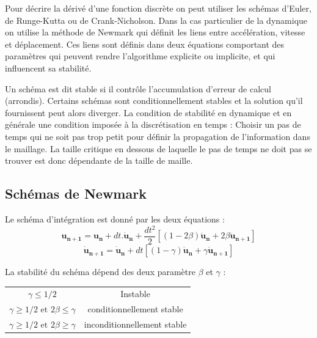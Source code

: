 \documentclass[12pt,a4paper]{report}
\begin{document}
Pour décrire la dérivé d'une fonction discrète on peut utiliser les schémas d'Euler, de Runge-Kutta ou de Crank-Nicholson. Dans la cas particulier de la dynamique on utilise la méthode de Newmark qui définit les liens entre accélération, vitesse et déplacement. Ces liens sont définis dans deux équations comportant des paramètres qui peuvent rendre l'algorithme explicite ou implicite, et qui influencent sa stabilité.

Un schéma est dit stable si il contrôle l'accumulation d'erreur de calcul (arrondis). Certains schémas sont conditionnellement stables et la solution qu'il fournissent peut alors diverger. La condition de stabilité en dynamique et en générale une condition imposée à la discrétisation en temps : Choisir un pas de temps qui ne soit pas trop petit pour définir la propagation de l'information dans le maillage. La taille critique en dessous de laquelle le pas de temps ne doit pas se trouver est donc dépendante de la taille de maille.

\subsection{Schémas de Newmark}

\noindent
Le schéma d'intégration est donné par les deux équations :
\begin{equation}
\label{Newmark1}
	\mathbf{u_{n+1}} = \mathbf{u_n} + dt.\mathbf{\dot{u}_n}
	+ \frac{dt^2}{2}[(1-2\beta)\mathbf{\ddot{u}_n} + 2\beta\mathbf{\ddot{u}_{n+1}}]
\end{equation}
\begin{equation}
\label{Newmark2}
	\mathbf{\dot{u}_{n+1}} = \mathbf{\dot{u}_n} 
	+ dt[(1-\gamma)\mathbf{\ddot{u}_n} + \gamma \mathbf{\ddot{u}_{n+1}}]
\end{equation}

\noindent
La stabilité du schéma dépend des deux paramètre $\beta$ et $\gamma$ :
\begin{center}
\begin{tabular}{c c}
$\gamma \leq 1/2$
& Instable\\
$\gamma \geq 1/2 \text{ et } 2 \beta \leq \gamma$
&conditionnellement stable\\
$\gamma \geq 1/2 \text{ et } 2 \beta \geq \gamma$
&inconditionnellement stable\\
\end{tabular}
\end{center}
\end{document}
